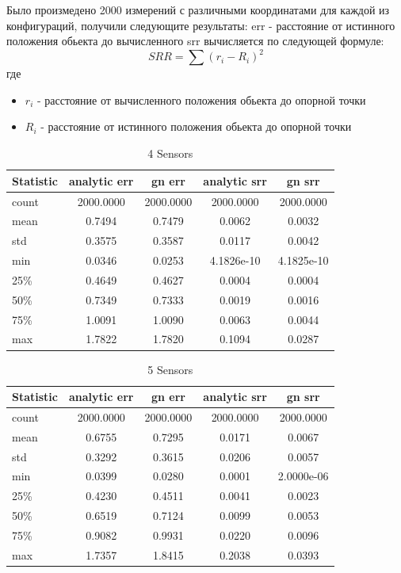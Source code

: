 \documentclass[a4paper,12pt]{article} %
\begin{document}
Было произмедено 2000 измерений с различными координатами для каждой из конфигураций, получили следующите результаты:
err - расстояние от истинного положения обьекта до вычисленного
srr вычисляется по следующей формуле:
\begin{equation}
SRR = \sum (r_i - R_i)^2
\end{equation}
 где 
 \begin{itemize}
     \item $r_i$ - расстояние от вычисленного положения обьекта до опорной точки
     \item  $R_i$ - расстояние от истинного положения обьекта до опорной точки
 \end{itemize}
\begin{table}[h]
\centering
\caption{4 Sensors}
\begin{tabular}{lcccc}
\toprule
Statistic & analytic err & gn err  & analytic srr  & gn srr \\
\midrule
count & 2000.0000 & 2000.0000 & 2000.0000 & 2000.0000 \\
mean & 0.7494 & 0.7479 & 0.0062 & 0.0032 \\
std & 0.3575 & 0.3587 & 0.0117 & 0.0042 \\
min & 0.0346 & 0.0253 & 4.1826e-10 & 4.1825e-10 \\
25\% & 0.4649 & 0.4627 & 0.0004 & 0.0004 \\
50\% & 0.7349 & 0.7333 & 0.0019 & 0.0016 \\
75\% & 1.0091 & 1.0090 & 0.0063 & 0.0044 \\
max & 1.7822 & 1.7820 & 0.1094 & 0.0287 \\
\bottomrule
\end{tabular}
\end{table}
\begin{table}[h]
\centering
\caption{5 Sensors}
\begin{tabular}{lcccc}
\toprule
Statistic & analytic err & gn err & analytic srr & gn srr \\
\midrule
count & 2000.0000 & 2000.0000 & 2000.0000 & 2000.0000 \\
mean & 0.6755 & 0.7295 & 0.0171 & 0.0067 \\
std & 0.3292 & 0.3615 & 0.0206 & 0.0057 \\
min & 0.0399 & 0.0280 & 0.0001 & 2.0000e-06 \\
25\% & 0.4230 & 0.4511 & 0.0041 & 0.0023 \\
50\% & 0.6519 & 0.7124 & 0.0099 & 0.0053 \\
75\% & 0.9082 & 0.9931 & 0.0220 & 0.0096 \\
max & 1.7357 & 1.8415 & 0.2038 & 0.0393 \\
\bottomrule
\end{tabular}
\end{table}
\\
\end{document}
